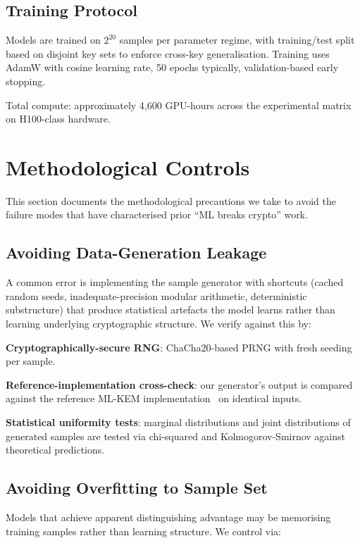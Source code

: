 \documentclass[sigconf,nonacm]{acmart}
\begin{document}
\subsection{Training Protocol}

Models are trained on $2^{20}$ samples per parameter regime, with
training/test split based on disjoint key sets to enforce cross-key
generalisation. Training uses AdamW with cosine learning rate,
50 epochs typically, validation-based early stopping.

Total compute: approximately 4{,}600 GPU-hours across the experimental
matrix on H100-class hardware.

\section{Methodological Controls}

This section documents the methodological precautions we take to
avoid the failure modes that have characterised prior
``ML breaks crypto'' work.

\subsection{Avoiding Data-Generation Leakage}

A common error is implementing the sample generator with
shortcuts (cached random seeds, inadequate-precision modular
arithmetic, deterministic substructure) that produce statistical
artefacts the model learns rather than learning underlying
cryptographic structure. We verify against this by:

\textbf{Cryptographically-secure RNG}: ChaCha20-based PRNG with
fresh seeding per sample.

\textbf{Reference-implementation cross-check}: our generator's
output is compared against the reference ML-KEM
implementation~\cite{nist2024fips203} on identical inputs.

\textbf{Statistical uniformity tests}: marginal distributions and
joint distributions of generated samples are tested via
chi-squared and Kolmogorov-Smirnov against theoretical predictions.

\subsection{Avoiding Overfitting to Sample Set}

Models that achieve apparent distinguishing advantage may be
memorising training samples rather than learning structure. We
control via:
\end{document}
